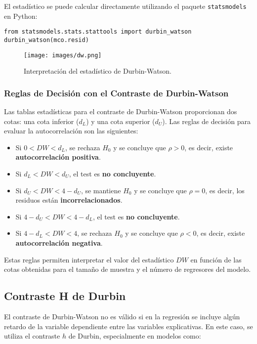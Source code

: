 \documentclass[a4paper,12pt]{article}
\begin{document}
El estadístico se puede calcular directamente utilizando el paquete \texttt{statsmodels} en Python:

\begin{verbatim}
from statsmodels.stats.stattools import durbin_watson
durbin_watson(mco.resid)
\end{verbatim}

\begin{figure}[H]
    \centering
    \texttt{[image: images/dw.png]}
    \caption{Interpretación del estadístico de Durbin-Watson.}
    \label{fig:DW}
\end{figure}

\subsubsection{Reglas de Decisión con el Contraste de Durbin-Watson}

Las tablas estadísticas para el contraste de Durbin-Watson proporcionan dos cotas: una cota inferior ($d_L$) y una cota superior ($d_U$). Las reglas de decisión para evaluar la autocorrelación son las siguientes:

\begin{itemize}
    \item Si $0 < DW < d_L$, se rechaza $H_0$ y se concluye que $\rho > 0$, es decir, existe \textbf{autocorrelación positiva}.
    \item Si $d_L < DW < d_U$, el test es \textbf{no concluyente}.
    \item Si $d_U < DW < 4 - d_U$, se mantiene $H_0$ y se concluye que $\rho = 0$, es decir, los residuos están \textbf{incorrelacionados}.
    \item Si $4 - d_U < DW < 4 - d_L$, el test es \textbf{no concluyente}.
    \item Si $4 - d_L < DW < 4$, se rechaza $H_0$ y se concluye que $\rho < 0$, es decir, existe \textbf{autocorrelación negativa}.
\end{itemize}

Estas reglas permiten interpretar el valor del estadístico $DW$ en función de las cotas obtenidas para el tamaño de muestra y el número de regresores del modelo.


\subsection{Contraste H de Durbin}

El contraste de Durbin-Watson no es válido si en la regresión se incluye algún retardo de la variable dependiente entre las variables explicativas. En este caso, se utiliza el contraste $h$ de Durbin, especialmente en modelos como:
\end{document}
